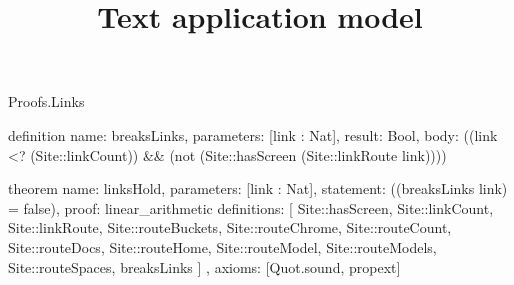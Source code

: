 \begin{lexlean}{Proofs.Links}
\title{Text application model}
\begin{semanticmodule}
definition{
  name: breaksLinks,
  parameters: [link : Nat],
  result: Bool,
  body: ((link <? (Site::linkCount)) && (not (Site::hasScreen (Site::linkRoute link))))
}

theorem{
  name: linksHold,
  parameters: [link : Nat],
  statement: ((breaksLinks link) = false),
  proof: linear_arithmetic{
    definitions: [
      Site::hasScreen,
      Site::linkCount,
      Site::linkRoute,
      Site::routeBuckets,
      Site::routeChrome,
      Site::routeCount,
      Site::routeDocs,
      Site::routeHome,
      Site::routeModel,
      Site::routeModels,
      Site::routeSpaces,
      breaksLinks
    ]
  },
  axioms: [Quot.sound, propext]
}
\end{semanticmodule}
\end{lexlean}
